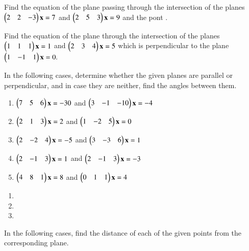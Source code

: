 \item Find the equation of the plane passing through the intersection of the planes 
$
\begin{pmatrix}2 & 2 & -3\end{pmatrix}\mathbf{x}=7
$
 and 
$
\begin{pmatrix}2 & 5 & 3\end{pmatrix}\mathbf{x}=9
$
and the pont .
%
\item  Find the equation of the plane through the intersection of the planes
$
\begin{pmatrix}1 & 1 & 1\end{pmatrix}\mathbf{x}=1
$
 and 
$
\begin{pmatrix}2 & 3 & 4\end{pmatrix}\mathbf{x}=5
$
which is perpendicular to the plane 
$
\begin{pmatrix}1 & -1 & 1\end{pmatrix}\mathbf{x}=0.
$
%
%
\item In the following cases, determine whether the given planes are parallel or perpendicular, and in case they are neither, find the angles between them.
\begin{enumerate}
\item 
$
\begin{pmatrix}7 & 5 & 6\end{pmatrix}\mathbf{x}=-30
$
 and 
$
\begin{pmatrix}3 & -1 & -10\end{pmatrix}\mathbf{x}=-4
$
%
\item 
$
\begin{pmatrix}2 & 1 & 3\end{pmatrix}\mathbf{x}=2
$
 and 
$
\begin{pmatrix}1 & -2 & 5\end{pmatrix}\mathbf{x}=0
$
%
\item 
$
\begin{pmatrix}2 & -2 & 4\end{pmatrix}\mathbf{x}=-5
$
 and 
$
\begin{pmatrix}3 & -3 & 6\end{pmatrix}\mathbf{x}=1
$
\item 
$
\begin{pmatrix}2 & -1 & 3\end{pmatrix}\mathbf{x}=1
$
 and 
$
\begin{pmatrix}2 & -1 & 3\end{pmatrix}\mathbf{x}=-3
$
\item 
$
\begin{pmatrix}4 & 8 & 1\end{pmatrix}\mathbf{x}=8
$
 and 
$
\begin{pmatrix}0 & 1 & 1\end{pmatrix}\mathbf{x}=4
$
\end{enumerate}
\solution
\begin{enumerate}
    \item 
    
    \item 
    
    \item 
    
\end{enumerate}
\item In the following cases, find the distance of each of the given points from the corresponding plane.
\begin{table}[!h]
\centering

\caption{}
\label{table:3d}
\end{table}
%
\item 

